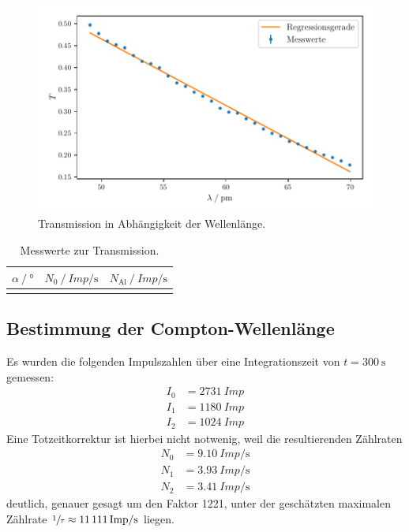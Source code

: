 \begin{figure}
    \centering
    \includegraphics[width=\textwidth]{build/plt/transmission.pdf}
    \caption{Transmission in Abhängigkeit der Wellenlänge.}
    \label{fig:plt_transmission}
\end{figure}

\clearpage
\begin{table}
  \centering
  \caption{Messwerte zur Transmission.}
  \label{tab:mess_transmission}
  \begin{tabular}{S S S}
  \toprule
  {$\alpha \mathbin{/} \si{\degree}$} &
  {$N_0 \mathbin{/} \si{{Imp}\per\second}$} &
  {$N_\text{Al} \mathbin{/} \si{{Imp}\per\second}$} \\
  \midrule
  \bottomrule
  \end{tabular}
\end{table}


\FloatBarrier
\subsection{Bestimmung der Compton-Wellenlänge}
\label{sec:auswertung:compton_wellenlaenge}

Es wurden die folgenden Impulszahlen über eine Integrationszeit von $t = \SI{300}{\second}$ gemessen:
\begin{align*}
  I_0 &= \SI{2731}{{Imp}} \tag {ohne Al-Absorper} \\
  I_1 &= \SI{1180}{{Imp}} \tag {mit Al-Absorber zwischen Röntgenröhre und Streuer} \\
  I_2 &= \SI{1024}{{Imp}} \tag {mit Al-Absorber zwischen Streuer und Geiger-Müller-Zählrohr}
\end{align*}
Eine Totzeitkorrektur ist hierbei nicht notwenig,
weil die resultierenden Zählraten
\begin{align*}
  N_0 &= \SI{9.10}{{Imp}\per\second} \\
  N_1 &= \SI{3.93}{{Imp}\per\second} \\
  N_2 &= \SI{3.41}{{Imp}\per\second}
\end{align*}
deutlich, genauer gesagt um den Faktor 1221,
unter der geschätzten maximalen Zählrate $\sfrac{1}{\tau} \approx \SI{11111}{{Imp}\per\second}$ liegen.

